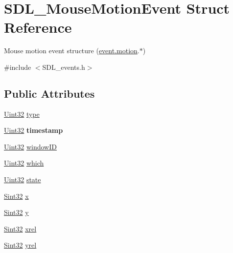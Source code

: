 \hypertarget{structSDL__MouseMotionEvent}{}\section{S\+D\+L\+\_\+\+Mouse\+Motion\+Event Struct Reference}
\label{structSDL__MouseMotionEvent}


Mouse motion event structure (\hyperlink{unionSDL__Event_ac3c89e190faacbe84280cd539453bab6}{event.\+motion}.$\ast$)  




{\ttfamily \#include $<$S\+D\+L\+\_\+events.\+h$>$}

\subsection*{Public Attributes}
\begin{DoxyCompactItemize}
\item 
\hyperlink{SDL__stdinc_8h_add440eff171ea5f55cb00c4a9ab8672d}{Uint32} \hyperlink{structSDL__MouseMotionEvent_a431dd28cd6db6a7335cf633dbeb80cfb}{type}
\item 
\hypertarget{structSDL__MouseMotionEvent_af530bc0ef327ea6d497c5b1da119841c}{}\hyperlink{SDL__stdinc_8h_add440eff171ea5f55cb00c4a9ab8672d}{Uint32} {\bfseries timestamp}\label{structSDL__MouseMotionEvent_af530bc0ef327ea6d497c5b1da119841c}

\item 
\hyperlink{SDL__stdinc_8h_add440eff171ea5f55cb00c4a9ab8672d}{Uint32} \hyperlink{structSDL__MouseMotionEvent_aa9976725242ada93a9e18e7fdf5796e6}{window\+I\+D}
\item 
\hyperlink{SDL__stdinc_8h_add440eff171ea5f55cb00c4a9ab8672d}{Uint32} \hyperlink{structSDL__MouseMotionEvent_a6f04c17b4305683915e2fd2dc3c36dbc}{which}
\item 
\hyperlink{SDL__stdinc_8h_add440eff171ea5f55cb00c4a9ab8672d}{Uint32} \hyperlink{structSDL__MouseMotionEvent_a3f6e9bad9d959b824881ba09e05b7024}{state}
\item 
\hyperlink{SDL__stdinc_8h_a7a90b941db9d4582e9ad7abb9940ff7e}{Sint32} \hyperlink{structSDL__MouseMotionEvent_a36398bb4a5308446a262b0bfc8baa80a}{x}
\item 
\hyperlink{SDL__stdinc_8h_a7a90b941db9d4582e9ad7abb9940ff7e}{Sint32} \hyperlink{structSDL__MouseMotionEvent_a7e6a7b1f8713d1968dc913908e8ea448}{y}
\item 
\hyperlink{SDL__stdinc_8h_a7a90b941db9d4582e9ad7abb9940ff7e}{Sint32} \hyperlink{structSDL__MouseMotionEvent_a1c01d9aba2a20778fb45a15dca39ef58}{xrel}
\item 
\hyperlink{SDL__stdinc_8h_a7a90b941db9d4582e9ad7abb9940ff7e}{Sint32} \hyperlink{structSDL__MouseMotionEvent_a7674c8b92d039ab948f671a180fa7b30}{yrel}
\end{DoxyCompactItemize}


